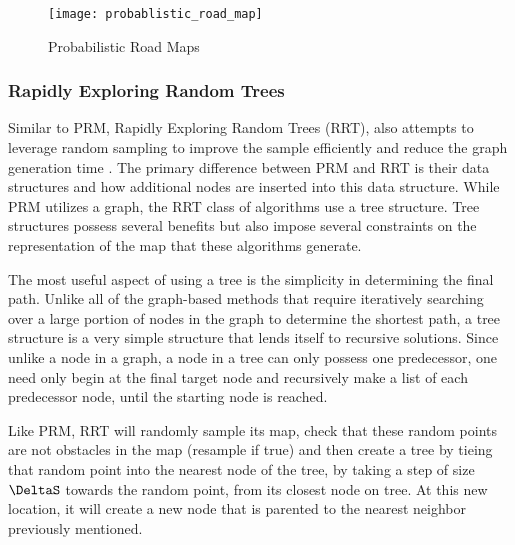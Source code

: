 

\begin{figure}[h!]
    \texttt{[image: probablistic\_road\_map]}
    \centering
    \label{fig:PRM}
    \caption{Probabilistic Road Maps}
  \end{figure}

\subsubsection{Rapidly Exploring Random Trees}

Similar to PRM, Rapidly Exploring Random Trees (RRT), also attempts to leverage random sampling to improve the sample efficiently and reduce the graph generation time \cite{LaValle1998RapidlyexploringRT}. The primary difference between PRM and RRT is their data structures and how additional nodes are inserted into this data structure. While PRM utilizes a graph, the RRT class of algorithms use a tree structure. Tree structures possess several benefits but also impose several constraints on the representation of the map that these algorithms generate. 

The most useful aspect of using a tree is the simplicity in determining the final path. Unlike all of the graph-based methods that require iteratively searching over a large portion of nodes in the graph to determine the shortest path, a tree structure is a very simple structure that lends itself to recursive solutions. Since unlike a node in a graph, a node in a tree can only possess one predecessor, one need only begin at the final target node and recursively make a list of each predecessor node, until the starting node is reached.

Like PRM, RRT will randomly sample its map, check that these random points are not obstacles in the map (resample if true) and then create a tree by tieing that random point into the nearest node of the tree, by taking a step of size $\DeltaS$ towards the random point, from its closest node on tree. At this new location, it will create a new node that is parented to the nearest neighbor previously mentioned. 



